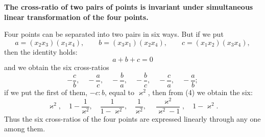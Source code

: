 \documentclass[11pt]{article}
\begin{document}
\begin{center}
\textbf{The cross-ratio of two pairs of points is invariant under simultaneous linear transformation of the four points.}
\end{center}

Four points can be separated into two pairs in six ways. But if we put
\[
a=(x_2x_3)(x_1x_4),\qquad b=(x_3x_1)(x_2x_4),\qquad c=(x_1x_2)(x_3x_4),
\]
then the identity holds:
\begin{equation}
a+b+c=0
\tag{4}
\end{equation}
and we obtain the six cross-ratios
\begin{equation}
-\frac{c}{b},\quad -\frac{a}{c},\quad -\frac{b}{a},\quad -\frac{b}{c},\quad -\frac{c}{a},\quad -\frac{a}{b};
\tag{5}
\end{equation}
if we put the first of them, $-c:b$, equal to $\varkappa^2$, then from (4) we obtain the six:
\begin{equation}
\varkappa^2,\quad 1-\frac1{\varkappa^2},\quad \frac1{1-\varkappa^2},\quad \frac1{\varkappa^2},\quad \frac{\varkappa^2}{\varkappa^2-1},\quad 1-\varkappa^2.
\tag{6}
\end{equation}
Thus the six cross-ratios of the four points are expressed linearly through any one among them.
\end{document}
